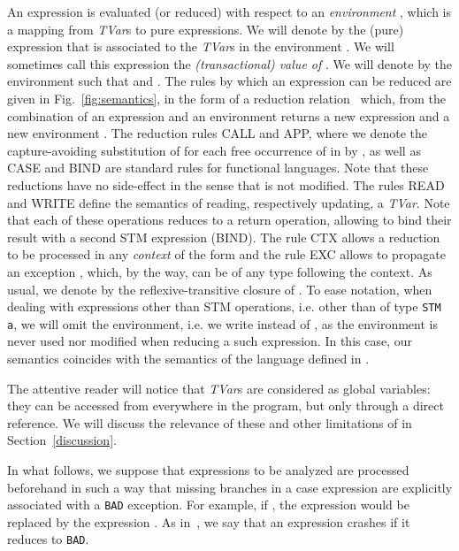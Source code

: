 \documentclass[submission,copyright,creativecommons]{eptcs}
\begin{document}
An expression is evaluated (or reduced) with respect to an \emph{environment} , which is a mapping from \emph{TVar}s  to pure expressions. We will denote by  the (pure) expression that is associated to the \emph{TVar}s  in the environment . We will sometimes call this expression the \emph{(transactional) value of }. We will denote by  the environment  such that  and . The rules by which an expression can be reduced are given in Fig.~\ref{fig:semantics}, in the form of a reduction relation~\cite{principles-program-analysis}  which, from the combination of an expression  and an environment  returns a new expression  and a new environment . 
The reduction rules CALL and APP, where we denote the capture-avoiding substitution of  for each free occurrence of  in  by , as well as CASE and BIND are standard rules for functional languages. Note that these reductions have no side-effect in the sense that  is not modified. The rules READ and WRITE define the semantics of reading, respectively updating, a \emph{TVar}. Note that each of these operations reduces to a return operation, allowing to bind their result with a second STM expression (BIND). The rule CTX allows a reduction to be processed in any \emph{context} of the form  and the rule EXC allows to propagate an exception , which, by the way, can be of any type following the context.
As usual, we denote by  the  reflexive-transitive closure of . 
To ease notation, when dealing with expressions other than STM operations, i.e. other than of type \texttt{STM a}, we will omit the environment, i.e. we write  instead of , as the environment is never used nor modified when reducing a such expression. In this case, our semantics coincides with the semantics of the language defined in \cite{static-contract-checking}.   


\newcommand{\diverges}[1]{\cpl{#1}\uparrow^{*}}
\newcommand{\divergespure}[1]{#1\uparrow^{*}}

The attentive reader will notice that 
\emph{TVar}s are considered as global variables: they can be accessed from everywhere in the program, but only through a direct reference. We will discuss the relevance of these and other limitations of  in Section~\ref{discussion}.

In what follows, we suppose that expressions to be analyzed are processed beforehand in such a way that missing branches in a case expression are explicitly associated with a \texttt{BAD} exception. For example, if , the expression  would be replaced by the expression . As in~\cite{static-contract-checking}, we say that an expression crashes if it reduces to \texttt{BAD}.
\end{document}
